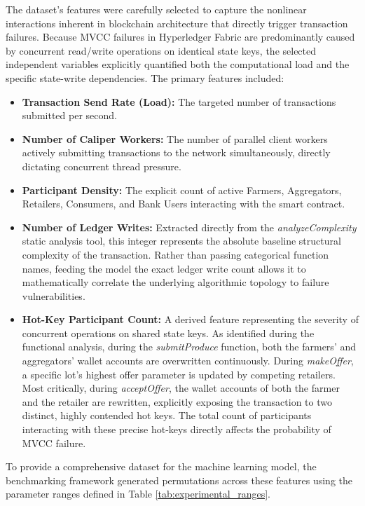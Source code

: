 \documentclass[12pt]{article}
\begin{document}
The dataset's features were carefully selected to capture the nonlinear interactions inherent in blockchain architecture that directly trigger transaction failures. Because MVCC failures in Hyperledger Fabric are predominantly caused by concurrent read/write operations on identical state keys, the selected independent variables explicitly quantified both the computational load and the specific state-write dependencies. The primary features included:
\begin{itemize}
    \item \textbf{Transaction Send Rate (Load):} The targeted number of transactions submitted per second.
    \item \textbf{Number of Caliper Workers:} The number of parallel client workers actively submitting transactions to the network simultaneously, directly dictating concurrent thread pressure.
    \item \textbf{Participant Density:} The explicit count of active Farmers, Aggregators, Retailers, Consumers, and Bank Users interacting with the smart contract.
    \item \textbf{Number of Ledger Writes:} Extracted directly from the \textit{analyzeComplexity} static analysis tool, this integer represents the absolute baseline structural complexity of the transaction. Rather than passing categorical function names, feeding the model the exact ledger write count allows it to mathematically correlate the underlying algorithmic topology to failure vulnerabilities.
    \item \textbf{Hot-Key Participant Count:} A derived feature representing the severity of concurrent operations on shared state keys. As identified during the functional analysis, during the \textit{submitProduce} function, both the farmers' and aggregators' wallet accounts are overwritten continuously. During \textit{makeOffer}, a specific lot's highest offer parameter is updated by competing retailers. Most critically, during \textit{acceptOffer}, the wallet accounts of both the farmer and the retailer are rewritten, explicitly exposing the transaction to two distinct, highly contended hot keys. The total count of participants interacting with these precise hot-keys directly affects the probability of MVCC failure.

\end{itemize}

To provide a comprehensive dataset for the machine learning model, the benchmarking framework generated permutations across these features using the parameter ranges defined in Table \ref{tab:experimental_ranges}.
\end{document}
